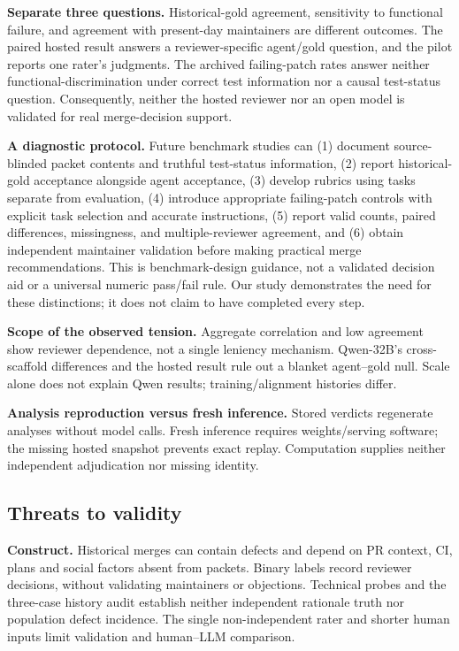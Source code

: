 \documentclass[10pt,conference]{IEEEtran}
\begin{document}
\textbf{Separate three questions.} Historical-gold agreement, sensitivity to functional
failure, and agreement with present-day maintainers are different outcomes. The paired
hosted result answers a reviewer-specific agent/gold question, and the pilot reports one
rater's judgments. The archived failing-patch rates answer neither functional-discrimination
under correct test information nor a causal test-status question. Consequently, neither
the hosted reviewer nor an open model is validated for real merge-decision support.

\textbf{A diagnostic protocol.} Future benchmark studies can (1) document source-blinded
packet contents and truthful test-status information, (2) report historical-gold acceptance
alongside agent acceptance, (3) develop rubrics using tasks separate from evaluation,
(4) introduce appropriate failing-patch controls with explicit task selection and accurate
instructions, (5) report valid counts, paired differences, missingness, and multiple-reviewer
agreement, and (6) obtain independent maintainer validation before making practical merge
recommendations. This is benchmark-design guidance, not a validated decision aid or a
universal numeric pass/fail rule. Our study demonstrates the need for these distinctions;
it does not claim to have completed every step.

\textbf{Scope of the observed tension.} Aggregate correlation and low agreement
show reviewer dependence, not a single leniency mechanism. Qwen-32B's
cross-scaffold differences and the hosted result rule out a blanket agent--gold
null. Scale alone does not explain Qwen results; training/alignment histories differ.

\textbf{Analysis reproduction versus fresh inference.} Stored verdicts regenerate
analyses without model calls. Fresh inference requires weights/serving software;
the missing hosted snapshot prevents exact replay. Computation supplies neither
independent adjudication nor missing identity.

\subsection{Threats to validity}
\textbf{Construct.} Historical merges can contain defects and depend on PR
context, CI, plans and social factors absent from packets. Binary labels record
reviewer decisions, without validating maintainers or objections. Technical probes
and the three-case history audit establish neither independent rationale truth nor
population defect incidence. The single non-independent rater and shorter human
inputs limit validation and human--LLM comparison.
\end{document}
